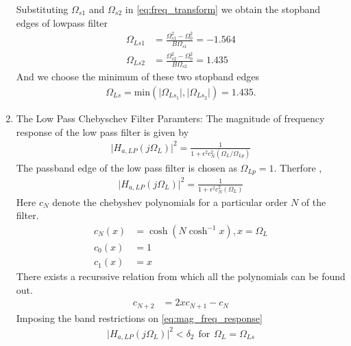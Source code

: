 \documentclass{article}
\begin{document}
\begin{enumerate}
          Substituting $\Omega_{s1}$ and $\Omega_{s2}$ in \eqref{eq:freq_transform} we obtain the stopband edges of lowpass filter 
          \begin{align}
              \Omega_{Ls1} & = \frac{\Omega_{s1}^2 - \Omega_0^2}{B\Omega_{s1}} = -1.564 \\
              \Omega_{Ls2} & = \frac{\Omega_{s2}^2 - \Omega_0^2}{B\Omega_{s2}} = 1.435
          \end{align}
          And we choose the minimum of these two stopband edges
          \begin{align}
              \Omega_{Ls} = \mbox{min}(\vert \Omega_{Ls_1}\vert,\vert \Omega_{Ls_2}\vert) = 1.435.
          \end{align}
    \item {The Low Pass Chebyschev Filter Paramters:} The magnitude of frequency response of the low pass filter is given by
          \begin{align}
              \vert H_{a,LP}(j\Omega_L)\vert^2 = \frac{1}{1 + \epsilon^2c_N^2(\Omega_L/\Omega_{Lp})} \label{eq:mag_freq_response}
          \end{align}
          The passband edge of the low pass filter is chosen as $\Omega_{Lp}=1$.
          Therfore ,
          \begin{align}
              \vert H_{a,LP}(j\Omega_L)\vert^2 = \frac{1}{1 + \epsilon^2c_N^2(\Omega_L)} \label{eq:specification}
          \end{align}
          Here $c_N$ denote the chebyshev polynomials for a particular order $N$ of the filter.
          \begin{align}
              c_N(x) & = \cosh(N \cosh^{-1}x) , x=\Omega_{L} \\
              c_0(x) & = 1                                   \\
              c_1(x) & = x
          \end{align}
          There exists a recurssive relation from which all the polynomials can be found out.
          \begin{align}
              c_{N+2} & = 2xc_{N+1} - c_{N}  \label{eq:cheby_poly_relation}
          \end{align}
          Imposing the band restrictions on \eqref{eq:mag_freq_response} \\
          \begin{align}
              \vert H_{a,LP}(j\Omega_L)\vert^2 < \delta_{2} \hspace{5pt} \text{for}\hspace{5pt} \Omega_L = \Omega_{Ls}     \\

\end{align}
\end{enumerate}
\end{document}
